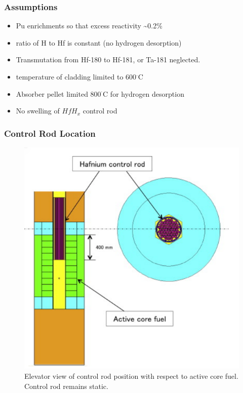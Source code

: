 \documentclass[9pt]{beamer}
\newcommand{\hfh}{$HfH_{x}$\xspace}
\begin{document}
\begin{frame}
\frametitle{Assumptions}
\begin{itemize}
    \item Pu enrichments so that excess reactivity \textasciitilde 0.2\% 
    \item ratio of H to Hf is constant (no hydrogen desorption)
    \item Transmutation from Hf-180 to Hf-181, or Ta-181 neglected.
    \item temperature of cladding limited to 600$^\cdot$C
    \item Absorber pellet limited $800^\cdot$C for hydrogen desorption
    \item No swelling of \hfh control rod
\end{itemize}
\end{frame}

\begin{frame}
\frametitle{Control Rod Location}
\begin{figure}[htbp!]
  \begin{center}
      \includegraphics[scale=0.3]{./images/elevator.png}
  \end{center}
  \caption{Elevator view of control rod position with respect to active core fuel. Control rod remains static.}
  \label{fig:elev}
\end{figure}
\end{frame}
\end{document}
